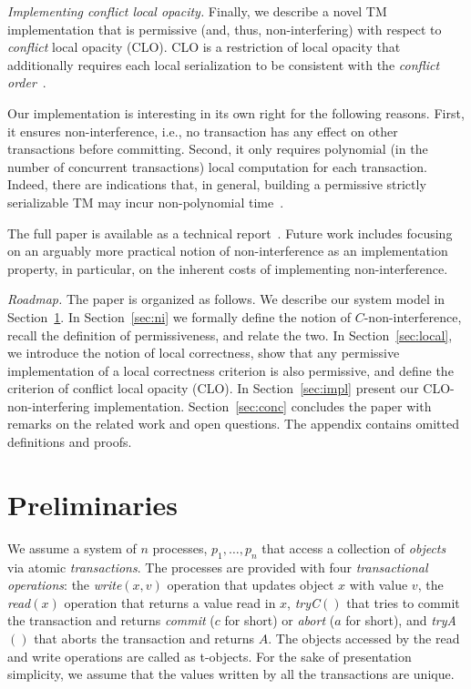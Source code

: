 \documentclass{llncs}
\newcommand{\op} {operation}
\newcommand{\tobj} {t-object}
\newcommand{\trya}{\textit{tryA}}
\begin{document}
\vspace{1mm}
\noindent
\textit{Implementing conflict local opacity.} 
Finally, we describe a novel TM implementation that is
permissive (and, thus, non-interfering) with respect to 
\emph{conflict} local opacity (CLO). 
CLO is a restriction of local opacity that 
additionally requires each local serialization to be
consistent with the \emph{conflict order}~\cite{Papad:1979:JACM,Hadzilacos:1988:JACM}.   

Our implementation is interesting in its own right for the following
reasons.
First, it ensures non-interference, i.e., no transaction has any
effect on other transactions before committing. Second, it only
requires polynomial (in the number of concurrent transactions) local
computation for each transaction. Indeed, there are indications that,
in general, building a permissive strictly serializable TM may incur non-polynomial
time~\cite{Papad:1979:JACM}.   

The full paper is available as a technical
report~\cite{KP12:TR}. Future work includes focusing on an arguably
more practical notion of non-interference as an implementation
property, in particular, on the inherent costs of implementing non-interference.

\vspace{1mm}
\noindent
\textit{Roadmap.} 
The paper is organized as follows. We describe our system model in
Section~\ref{sec:model}. In Section~\ref{sec:ni} we formally define
the notion of $C$-non-interference, recall the definition of
permissiveness, and relate the two. In Section~\ref{sec:local}, we introduce the notion of
local correctness, show that any permissive implementation of a local
correctness criterion is also permissive,  and define the criterion of conflict local
opacity (CLO).
In Section~\ref{sec:impl} present our CLO-non-interfering implementation.
Section~\ref{sec:conc} concludes the paper with remarks on the related
work and open questions.
The appendix contains omitted definitions and proofs.


\section{Preliminaries}
\label{sec:model}

We assume a system of $n$ processes, $p_1,\ldots,p_n$ that access a
collection of \emph{objects} via atomic \emph{transactions}.
The processes are provided with  four \emph{transactional operations}: the
\textit{write}$(x,v)$ operation that updates object $x$ with value
$v$, the \textit{read}$(x)$ operation that returns a value read in
$x$, \textit{tryC}$()$ that tries to commit the transaction and
returns \textit{commit} ($c$ for short) or \textit{abort} ($a$ for
short), and \textit{\trya}$()$ that aborts the transaction and returns
$A$. The objects accessed by the read and write \op{s} are called as
\tobj{s}. For the sake of presentation simplicity, we assume that the
values written by all the transactions are unique. 
\end{document}
